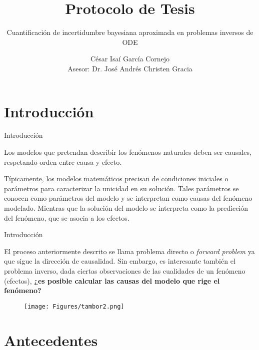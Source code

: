 \documentclass[10pt]{beamer}
\title{Protocolo de Tesis}
\subtitle{Cuantificación de incertidumbre bayesiana aproximada en problemas inversos de ODE}
\date{}
\author{César Isaí García Cornejo\\
Asesor: Dr. José Andrés Christen Gracia}
\institute{CIMAT}
\begin{document}
\maketitle


\section[Introducción]{Introducción}

\begin{frame}[fragile]{Introducción}
  
  Los modelos que pretendan describir los fenómenos naturales deben ser causales, respetando orden entre causa y efecto.

  Típicamente, los modelos matemáticos precisan de condiciones iniciales o parámetros  para caracterizar la unicidad en su solución. Tales parámetros se conocen como parámetros del modelo y se interpretan como causas del fenómeno modelado. Mientras que la solución del modelo se interpreta como la predicción del fenómeno, que se asocia a los efectos.
  
\end{frame}


\begin{frame}[fragile]{Introducción}
  
  El proceso anteriormente descrito se llama problema directo o \textit{forward problem} ya que sigue la dirección de causalidad. Sin embargo, es interesante también el problema inverso, dada ciertas observaciones de las cualidades de un fenómeno (efectos), \textbf{¿es posible calcular las causas del modelo que rige el fenómeno?}

  \begin{figure}[H] 
      \centering 
      \texttt{[image: Figures/tambor2.png]} 
  \end{figure} 

\end{frame}

\section{Antecedentes}
\end{document}
